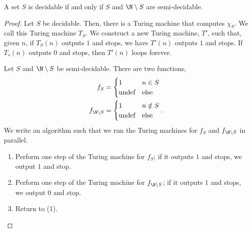 \documentclass[10pt]{mypackage}
\begin{document}
\begin{theorem}
  A set $S$ is decidable if and only if $S$ and $\N\setminus S$ are semi-decidable.
\end{theorem}
\begin{proof}
  Let $S$ be decidable. Then, there is a Turing machine that computes $\chi_S$. We call this Turing machine $T_S$. We construct a new Turing machine, $T'$, such that, given $n$, if $T_S(n)$ outputs $1$ and stops, we have $T'(n)$ outputs $1$ and stops. If $T_s\left(n\right) $ outputs $0$ and stops, then $T'\left(n\right)$ loops forever.\newline

  Let $S$ and $\N\setminus S$ be semi-decidable. There are two functions,
  \begin{align*}
    f_S &= \begin{cases}
      1 & n\in S\\
      \text{undef} & \text{else}
    \end{cases}\\
      f_{\N\setminus S} &= \begin{cases}
        1 & n\notin S\\
        \text{undef} & \text{else}
      \end{cases}.
  \end{align*}
  We write an algorithm such that we run the Turing machines for $f_S$ and $f_{\N\setminus S}$ in parallel.\newline
  \begin{enumerate}[(1)]
    \item Perform one step of the Turing machine for $f_{S}$; if it outputs $1$ and stops, we output $1$ and stop.
    \item Perform one step of the Turing machine for $f_{\N\setminus S}$; if it outputs $1$ and stops, we output $0$ and stop.
    \item Return to (1).
  \end{enumerate}
\end{proof}
\end{document}

